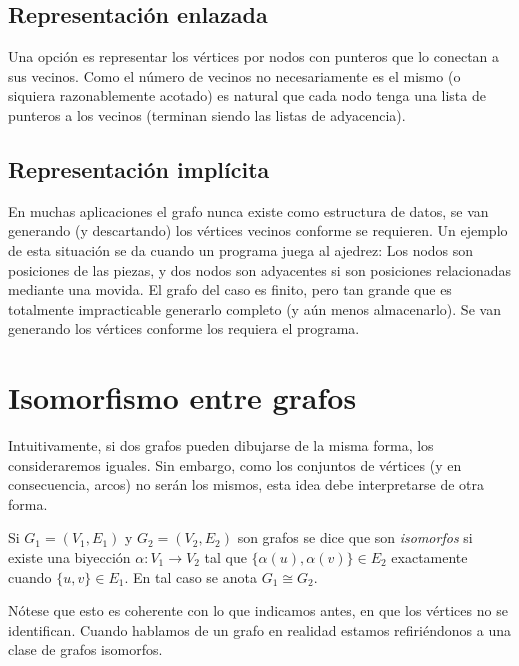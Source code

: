 \subsection{Representación enlazada}
\label{sec:grafo-punteros}

  Una opción es representar los vértices por nodos
  con punteros que lo conectan a sus vecinos.
  Como el número de vecinos no necesariamente es el mismo
  (o siquiera razonablemente acotado)
  es natural que cada nodo tenga una lista de punteros a los vecinos
  (terminan siendo las listas de adyacencia).

\subsection{Representación implícita}
\label{sec:grafo-implicita}

  En muchas aplicaciones
  el grafo nunca existe como estructura de datos,
  se van generando
  (y descartando)
  los vértices vecinos conforme se requieren.
  Un ejemplo de esta situación se da
  cuando un programa juega al ajedrez:
  Los nodos son posiciones de las piezas,
  y dos nodos son adyacentes
  si son posiciones relacionadas mediante una movida.
  El grafo del caso es finito,
  pero tan grande que es totalmente impracticable generarlo completo
  (y aún menos almacenarlo).
  Se van generando los vértices conforme los requiera el programa.

\section{Isomorfismo entre grafos}
\label{sec:isomorfismo}

  Intuitivamente,
  si dos grafos pueden dibujarse de la misma forma,
  los consideraremos iguales.
  Sin embargo,
  como los conjuntos de vértices
  (y en consecuencia,
   arcos)
  no serán los mismos,
  esta idea debe interpretarse de otra forma.
  \begin{definition}
    Si \(G_1 = (V_1, E_1)\) y \(G_2 = (V_2, E_2)\) son grafos
    se dice que son \emph{isomorfos}
    si existe una biyección \(\alpha \colon V_1 \rightarrow V_2\)
    tal que \(\{\alpha(u), \alpha(v)\} \in E_2\)
    exactamente cuando \(\{u, v\} \in E_1\).
    En tal caso se anota \(G_1 \cong G_2\).
  \end{definition}
  Nótese que esto es coherente con lo que indicamos antes,
  en que los vértices no se identifican.
  Cuando hablamos de un grafo en realidad estamos refiriéndonos
  a una clase de grafos isomorfos.

